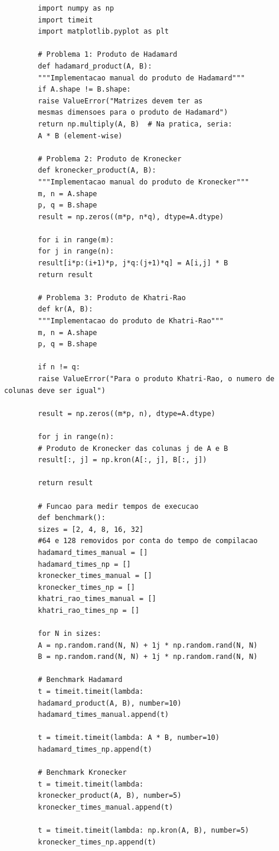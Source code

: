 \documentclass[a4paper, 12pt]{article}
\begin{document}
	\begin{lstlisting}
		import numpy as np
		import timeit
		import matplotlib.pyplot as plt
		
		# Problema 1: Produto de Hadamard
		def hadamard_product(A, B):
		"""Implementacao manual do produto de Hadamard"""
		if A.shape != B.shape:
		raise ValueError("Matrizes devem ter as 
		mesmas dimensoes para o produto de Hadamard")
		return np.multiply(A, B)  # Na pratica, seria: 
		A * B (element-wise)
		
		# Problema 2: Produto de Kronecker
		def kronecker_product(A, B):
		"""Implementacao manual do produto de Kronecker"""
		m, n = A.shape
		p, q = B.shape
		result = np.zeros((m*p, n*q), dtype=A.dtype)
		
		for i in range(m):
		for j in range(n):
		result[i*p:(i+1)*p, j*q:(j+1)*q] = A[i,j] * B
		return result
		
		# Problema 3: Produto de Khatri-Rao
		def kr(A, B):
		"""Implementacao do produto de Khatri-Rao"""
		m, n = A.shape
		p, q = B.shape
		
		if n != q:
		raise ValueError("Para o produto Khatri-Rao, o numero de colunas deve ser igual")
		
		result = np.zeros((m*p, n), dtype=A.dtype)
		
		for j in range(n):
		# Produto de Kronecker das colunas j de A e B
		result[:, j] = np.kron(A[:, j], B[:, j])
		
		return result
		
		# Funcao para medir tempos de execucao
		def benchmark():
		sizes = [2, 4, 8, 16, 32] 
		#64 e 128 removidos por conta do tempo de compilacao
		hadamard_times_manual = []
		hadamard_times_np = []
		kronecker_times_manual = []
		kronecker_times_np = []
		khatri_rao_times_manual = []
		khatri_rao_times_np = []
		
		for N in sizes:
		A = np.random.rand(N, N) + 1j * np.random.rand(N, N)
		B = np.random.rand(N, N) + 1j * np.random.rand(N, N)
		
		# Benchmark Hadamard
		t = timeit.timeit(lambda: 
		hadamard_product(A, B), number=10)
		hadamard_times_manual.append(t)
		
		t = timeit.timeit(lambda: A * B, number=10)
		hadamard_times_np.append(t)
		
		# Benchmark Kronecker
		t = timeit.timeit(lambda: 
		kronecker_product(A, B), number=5)
		kronecker_times_manual.append(t)
		
		t = timeit.timeit(lambda: np.kron(A, B), number=5)
		kronecker_times_np.append(t)
		

\end{lstlisting}
\end{document}
